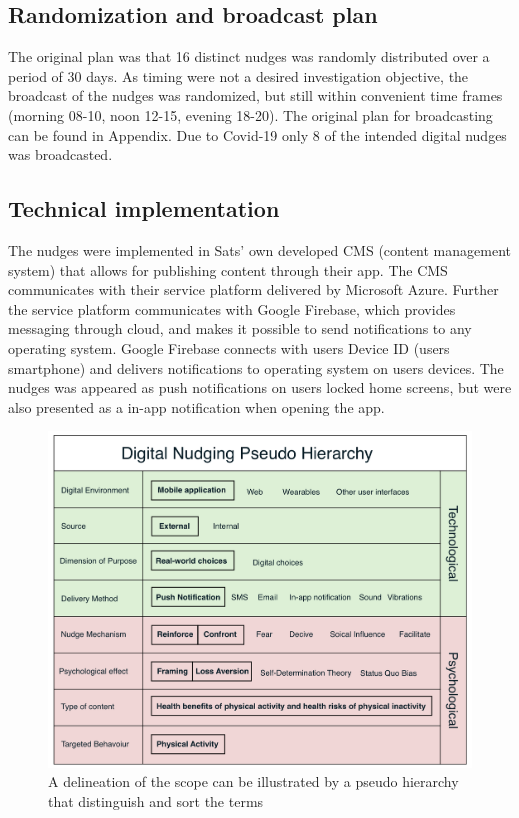 \subsection{Randomization and broadcast plan}
The original plan was that 16 distinct nudges was randomly distributed over a period of 30 days. As timing were not a desired investigation objective, the broadcast of the nudges was randomized, but still within convenient time frames (morning 08-10, noon 12-15, evening 18-20). The original plan for broadcasting can be found in Appendix. Due to Covid-19 only 8 of the intended digital nudges was broadcasted. 

\subsection{Technical implementation}
The nudges were implemented in Sats' own developed CMS (content management system) that allows for publishing content through their app. The CMS communicates with their service platform delivered by Microsoft Azure. Further the service platform communicates with Google Firebase, which provides messaging through cloud, and makes it possible to send notifications to any operating system. Google Firebase connects with users Device ID (users smartphone) and delivers notifications to operating system on users devices. The nudges was appeared as push notifications on users locked home screens, but were also presented as a in-app notification when opening the app. 


\bigbreak
\bigbreak
\begin{figure}[ht]
\includegraphics[width=1\textwidth]{images/Nudge.png}
\caption{A delineation of the scope can be illustrated by a pseudo hierarchy that distinguish and sort the terms}
\end{figure}
\bigbreak
\bigbreak
